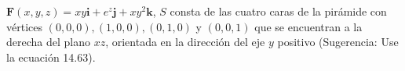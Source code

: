 \item $\mathbf{F}(x, y, z) = xy \mathbf{i} + e^z \mathbf{j} + xy^2 \mathbf{k}$, $S$ consta de las cuatro caras de la pirámide con vértices $(0, 0, 0), (1, 0, 0), (0, 1, 0)$ y $(0, 0, 1)$ que se encuentran a la derecha del plano $xz$, orientada en la dirección del eje $y$ positivo (Sugerencia: Use la ecuación 14.63).
